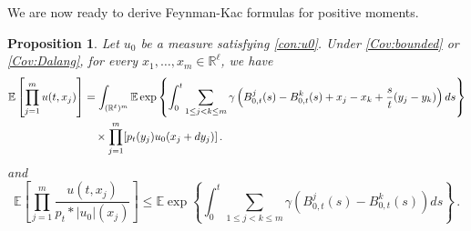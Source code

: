 \documentclass[12pt,reqno]{amsart}
\newtheorem{proposition}[theorem]{Proposition}
\theoremstyle{remark}
\newcommand{\1}{\mathbf{1}}
\def\RR{\mathbb{R}}
\def\EE{\mathbb{E}}
\def\lt{\left}
\def\rt{\right}
\begin{document}
	We are now ready to derive Feynman-Kac formulas for positive moments. 
	\begin{proposition}\label{prop:upB} Let $u_0$ be a measure satisfying \eqref{con:u0}. Under \ref{Cov:bounded} or \ref{Cov:Dalang}, for every $x_1,\dots,x_m\in\RR^\ell$, we have
		\begin{align}\label{eqn:FKbridge}
			\EE\left[\prod_{j=1}^m u(t,x_j)\right]
			&=\int_{(\RR^\ell)^m}   \notag 
			\EE\exp\left\{\int_0^t\sum_{1\le j<k\le m} \gamma\left(B_{0,t}^j(s)-B_{0,t}^k(s)+x_j-x_k+\frac st(y_j-y_k)\right)ds\right\}  \\
			&\quad  \times \prod_{j=1}^m [p_t(y_j)u_{0}(x_j+dy_j)]\,.
		\end{align}
	and
		\begin{equation}\label{ineq:upB}
		\EE \lt[\prod_{j=1}^m \frac{u(t,x_j)}{p_t*|u_0|(x_j)} \rt]\le \EE\exp\left\{\int_0^t\sum_{1\le j<k\le m} \gamma\left(B_{0,t}^j(s)-B_{0,t}^k(s)\right)ds\right\}\,.
	\end{equation}
	\end{proposition}
\end{document}
